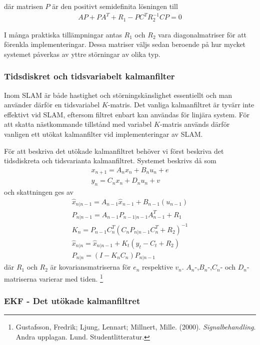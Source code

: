 \documentclass[a4paper,12pt,fleqn]{article}
\begin{document}
där matrisen $P$ är den positivt semidefinita lösningen till 
\begin{gather}
AP + PA^{T} + R_{1} - PC^{T}R_{2}^{-1}CP = 0
\end{gather}

I många praktiska tillämpningar antas $R_{1}$ och $R_{2}$ vara diagonalmatriser för att förenkla implementeringar. Dessa matriser väljs sedan beroende på hur mycket systemet påverkas av yttre störningar av olika typ. 

\subsubsection{Tidsdiskret och tidsvariabelt kalmanfilter} Inom SLAM är både hastighet och störningskänslighet essentiellt och man använder därför en tidsvariabel $K$-matris. Det vanliga kalmanfiltret är tyvärr inte effektivt vid SLAM, eftersom filtret enbart kan användas för linjära system. För att skatta nästkommande tillstånd med variabel $K$-matris används därför vanligen ett utökat kalmanfilter vid implementeringar av SLAM. 

För att beskriva det utökade kalmanfiltret behöver vi först beskriva det tidsdiskreta och tidsvarianta kalmanfiltret. Systemet beskrivs då som 
\begin{gather}
x_{n+1} = A_nx_n + B_nu_n+e \\
y_n = C_nx_n + D_nu_n + v
\end{gather}
och skattningen ges av
\begin{gather}
	\hat{x}_{n|n-1} = A_{n-1}\hat{x}_{n-1} + B_{n-1}(u_{n-1}) \\
	P_{n|n-1}=A_{n-1}P_{n-1|n-1}A^T_{n-1}+R_1 \\
	K_n = P_{n-1}C_{n}^T(C_{n}P_{n|n-1}C_{n}^T+R_2)^{-1}	\\
	\hat{x}_{n|n} = \hat{x}_{n|n-1} + K_{t}(y_{t}-C_{t}+R_{2})\\
	P_{n|n}=(I-K_nC_n)P_{n|n-1}	
\end{gather}
där $R_1$ och $R_2$ är kovariansmatriserna för $e_n$ respektive $v_n$. $A_n$-,$B_n$-,$C_n$- och $D_n$-matriserna varierar med tiden. \footnote{Gustafsson, Fredrik; Ljung, Lennart; Millnert, Mille. (2000). \textit{Signalbehandling}. Andra upplagan. Lund. Studentlitteratur.
}

\subsubsection{EKF - Det utökade kalmanfiltret}
\end{document}
